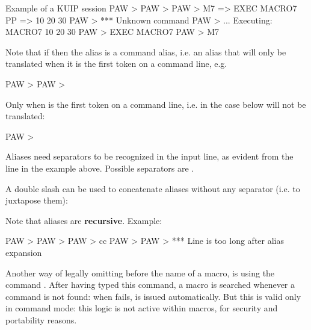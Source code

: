 \begin{XMPt}{Example of a KUIP session}
PAW > 
PAW > 
PAW > 
M7  =>  EXEC MACRO7
PP  =>  10 20 30
PAW > 
*** Unknown command
PAW > 
   ...   Executing: MACRO7 10 20 30
PAW > 
EXEC MACRO7
PAW > 
M7
\end{XMPt}

Note that if  then the alias is a command alias, 
i.e. an alias that
will only be translated when it is the first token on a command line, e.g.

\begin{XMP} 
PAW > \quad PAW > 
\end{XMP} 

Only when  is the first token on a command line, i.e. in the case below
 will not be translated:

\begin{XMP} 
PAW > 
\end{XMP}

Aliases need separators
to be recognized in the input line, as evident from
the  line in the example above. 
Possible separators are .

A double slash \Lit{//} can be used
to concatenate aliases without any separator (i.e. to juxtapose them):

Note that aliases are {\bf recursive}.
Example:
\begin{XMP}
PAW > 
PAW > 
PAW > 
cc
PAW > 
PAW > 
*** Line is too long after alias expansion
\end{XMP}

Another way of legally omitting  before the name
of a macro, is using the command .
After having typed this command, a macro is searched whenever a command is not found:
when  fails,  is issued automatically.
But this is valid only in command mode: this logic is not active within macros,
for security and portability reasons.
 
